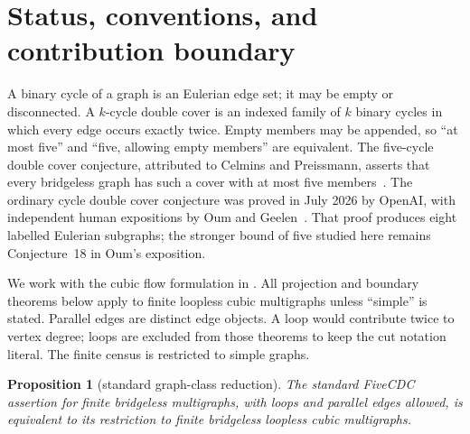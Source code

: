 \documentclass[11pt]{article}
\newtheorem{proposition}[theorem]{Proposition}
\theoremstyle{definition}
\theoremstyle{remark}
\begin{document}
\tableofcontents

\section{Status, conventions, and contribution boundary}

A binary cycle of a graph is an Eulerian edge set; it may be empty or
disconnected.  A \(k\)-cycle double cover is an indexed family of \(k\)
binary cycles in which every edge occurs exactly twice.  Empty members may
be appended, so ``at most five'' and ``five, allowing empty members'' are
equivalent.  The five-cycle double cover conjecture, attributed to Celmins
and Preissmann, asserts that every bridgeless graph has such a cover with
at most five members~\cite{Celmins1985,Preissmann1981}.
The ordinary cycle double cover conjecture was proved in July 2026 by
OpenAI, with independent human expositions by Oum and
Geelen~\cite{OpenAI2026CDC,Oum2026CDC,Geelen2026CDC}.  That proof produces
eight labelled Eulerian subgraphs; the stronger bound of five studied here
remains Conjecture~18 in Oum's exposition.

We work with the cubic flow formulation in
\cite[Conjecture~3.19]{HusekSamal2026}.  All projection and boundary
theorems below apply to finite loopless cubic multigraphs unless
``simple'' is stated.  Parallel edges are distinct edge objects.  A loop
would contribute twice to vertex degree; loops are excluded from those
theorems to keep the cut notation literal.  The finite census is restricted
to simple graphs.

\begin{proposition}[standard graph-class reduction]
\label{prop:cubicreduction}
The standard FiveCDC assertion for finite bridgeless multigraphs, with
loops and parallel edges allowed, is equivalent to its restriction to
finite bridgeless loopless cubic multigraphs.
\end{proposition}
\end{document}
